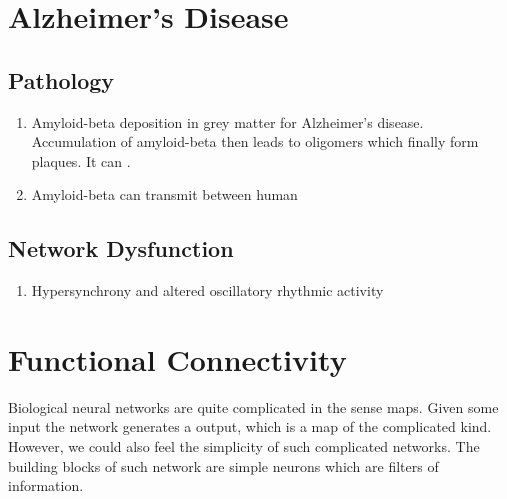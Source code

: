 \documentclass[letterpaper,10pt,english]{sphinxmanual}
\begin{document}
\section{Alzheimer’s Disease}
\label{\detokenize{neuroscience/alzheimers-disease::doc}}\label{\detokenize{neuroscience/alzheimers-disease:alzheimer-s-disease}}

\subsection{Pathology}
\label{\detokenize{neuroscience/alzheimers-disease:pathology}}\begin{enumerate}
\item {} 
Amyloid-beta deposition in grey matter for Alzheimer’s disease. Accumulation of amyloid-beta then leads to oligomers which finally form plaques. It can . \label{\detokenize{neuroscience/alzheimers-disease:id1}}{\hyperref[\detokenize{neuroscience/alzheimers-disease:laferla2008}]{\sphinxcrossref{{[}LaFerla2008{]}}}}

\item {} 
Amyloid-beta can transmit between human \label{\detokenize{neuroscience/alzheimers-disease:id2}}{\hyperref[\detokenize{neuroscience/alzheimers-disease:jaunmuktane2015}]{\sphinxcrossref{{[}Jaunmuktane2015{]}}}}

\end{enumerate}


\subsection{Network Dysfunction}
\label{\detokenize{neuroscience/alzheimers-disease:network-dysfunction}}\begin{enumerate}
\item {} 
Hypersynchrony and altered oscillatory rhythmic activity \label{\detokenize{neuroscience/alzheimers-disease:id3}}{\hyperref[\detokenize{neuroscience/alzheimers-disease:palop2016}]{\sphinxcrossref{{[}Palop2016{]}}}}

\end{enumerate}


\section{Functional Connectivity}
\label{\detokenize{neuroscience/functional-connectivity::doc}}\label{\detokenize{neuroscience/functional-connectivity:functional-connectivity}}
Biological neural networks are quite complicated in the sense maps. Given some input the network generates a output, which is a map of the complicated kind. However, we could also feel the simplicity of such complicated networks. The building blocks of such network are simple neurons which are filters of information.
\end{document}
